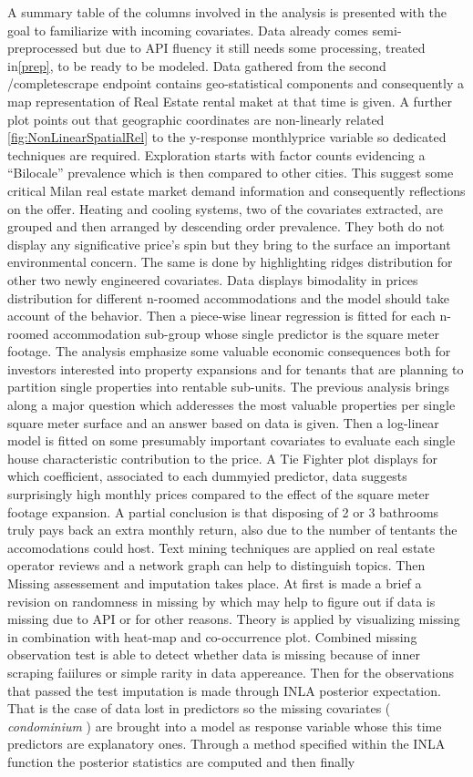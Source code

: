 \documentclass[
  12pt,
  a4paper,
  oneside]{book}
\theoremstyle{definition}
\theoremstyle{definition}
\theoremstyle{definition}
\theoremstyle{remark}
\begin{document}
A summary table of the columns involved in the analysis is presented with the goal to familiarize with incoming covariates. Data already comes semi-preprocessed but due to API fluency it still needs some processing, treated in\ref{prep}, to be ready to be modeled. Data gathered from the second /completescrape endpoint contains geo-statistical components and consequently a map representation of Real Estate rental maket at that time is given. A further plot points out that geographic coordinates are non-linearly related \ref{fig:NonLinearSpatialRel} to the y-response monthlyprice variable so dedicated techniques are required. Exploration starts with factor counts evidencing a ``Bilocale'' prevalence which is then compared to other cities. This suggest some critical Milan real estate market demand information and consequently reflections on the offer. Heating and cooling systems, two of the covariates extracted, are grouped and then arranged by descending order prevalence. They both do not display any significative price's spin but they bring to the surface an important environmental concern. The same is done by highlighting ridges distribution for other two newly engineered covariates. Data displays bimodality in prices distribution for different n-roomed accommodations and the model should take account of the behavior. Then a piece-wise linear regression is fitted for each n-roomed accommodation sub-group whose single predictor is the square meter footage. The analysis emphasize some valuable economic consequences both for investors interested into property expansions and for tenants that are planning to partition single properties into rentable sub-units. The previous analysis brings along a major question which adderesses the most valuable properties per single square meter surface and an answer based on data is given. Then a log-linear model is fitted on some presumably important covariates to evaluate each single house characteristic contribution to the price. A Tie Fighter plot displays for which coefficient, associated to each dummyied predictor, data suggests surprisingly high monthly prices compared to the effect of the square meter footage expansion. A partial conclusion is that disposing of 2 or 3 bathrooms truly pays back an extra monthly return, also due to the number of tentants the accomodations could host. Text mining techniques are applied on real estate operator reviews and a network graph can help to distinguish topics. Then Missing assessement and imputation takes place. At first is made a brief a revision on randomness in missing by \citet{Little} which may help to figure out if data is missing due to API or for other reasons. Theory is applied by visualizing missing in combination with heat-map and co-occurrence plot. Combined missing observation test is able to detect whether data is missing because of inner scraping faiilures or simple rarity in data appereance. Then for the observations that passed the test imputation is made through INLA posterior expectation. That is the case of data lost in predictors so the missing covariates ( \emph{condominium} ) are brought into a model as response variable whose this time predictors are explanatory ones. Through a method specified within the INLA function the posterior statistics are computed and then finally 
\end{document}
